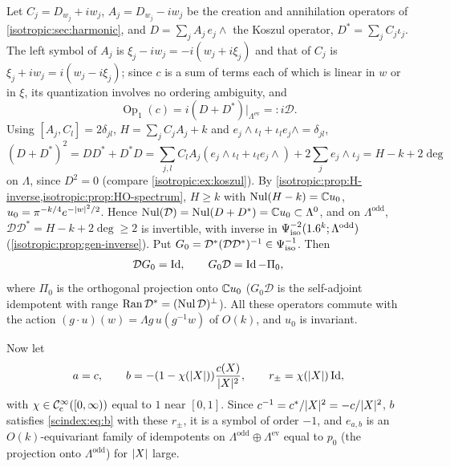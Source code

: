 Let $C_j=D_{w_j}+iw_j$, $A_j=D_{w_j}-iw_j$ be the creation and annihilation
operators of \cref{isotropic:sec:harmonic}, and $D=\sum_jA_j\,e_j\wedge$ the Koszul
operator, $D^*=\sum_jC_j\iota_j$. The left symbol of $A_j$ is
$\xi_j-iw_j=-i(w_j+i\xi_j)$ and that of $C_j$ is $\xi_j+iw_j=i(w_j-i\xi_j)$; since
$c$ is a sum of terms each of which is linear in $w$ or in $\xi$, its quantization
involves no ordering ambiguity, and
\begin{equation}\label{scindex:eq:koszul}
  \operatorname{Op}_1(c)=i(D+D^*)\big|_{\Lambda^{\mathrm{ev}}}=:i\mathcal D.
\end{equation}
Using $[A_j,C_l]=2\delta_{jl}$, $H=\sum_jC_jA_j+k$ and $e_j\wedge\iota_l+\iota_l
e_j\wedge=\delta_{jl}$,
\begin{equation*}
  (D+D^*)^2=DD^*+D^*D=\sum_{j,l}C_lA_j(e_j\wedge\iota_l+\iota_le_j\wedge)
  +2\sum_je_j\wedge\iota_j=H-k+2\deg
\end{equation*}
on $\Lambda$, since $D^2=0$ (compare \cref{isotropic:ex:koszul}). By \cref{isotropic:prop:H-inverse,isotropic:prop:HO-spectrum}, $H\ge k$ with
$\operatorname{Nul}(H-k)=\mathbb{C} u_0$, $u_0=\pi^{-k/4}e^{-\lvert w\rvert^2/2}$. Hence
$\operatorname{Nul}(\mathcal D)=\operatorname{Nul}(D+D^*)=\mathbb{C} u_0\subset\Lambda^0$, and on
$\Lambda^{\mathrm{odd}}$, $\mathcal D\mathcal D^*=H-k+2\deg\ge2$ is invertible,
with inverse in $\Psi^{-2}_{\mathrm{iso}}(1.6^k;\Lambda^{\mathrm{odd}})$
(\cref{isotropic:prop:gen-inverse}). Put $G_0=\mathcal D^*(\mathcal D\mathcal D^*)^{-1}\in
\Psi^{-1}_{\mathrm{iso}}$. Then
\begin{equation}\label{scindex:eq:G0}
  \mathcal DG_0=\operatorname{Id},\qquad G_0\mathcal D=\operatorname{Id}-\Pi_0,
\end{equation}
where $\Pi_0$ is the orthogonal projection onto $\mathbb{C} u_0$ ($G_0\mathcal D$ is the
self-adjoint idempotent with range $\operatorname{Ran}\mathcal D^*=(\operatorname{Nul}\mathcal D)^\perp$).
All these operators commute with the action $(g\cdot u)(w)=\Lambda g\,u(g^{-1}w)$
of $O(k)$, and $u_0$ is invariant.

Now let
\begin{equation*}
  a=c,\qquad b=-(1-\chi(\lvert X\rvert))\frac{c(X)}{\lvert X\rvert^2},\qquad
  r_\pm=\chi(\lvert X\rvert)\operatorname{Id},
\end{equation*}
with $\chi\in\mathcal{C}^\infty_{\mathrm{c}}([0,\infty))$ equal to $1$ near $[0,1]$. Since $c^{-1}=c^*/\lvert X\rvert^2
=-c/\lvert X\rvert^2$, $b$ satisfies \eqref{scindex:eq:b} with these $r_\pm$, it is a
symbol of order $-1$, and $e_{a,b}$ is an $O(k)$-equivariant family of
idempotents on $\Lambda^{\mathrm{odd}}\oplus\Lambda^{\mathrm{ev}}$ equal to $p_0$
(the projection onto $\Lambda^{\mathrm{odd}}$) for $\lvert X\rvert$ large.

